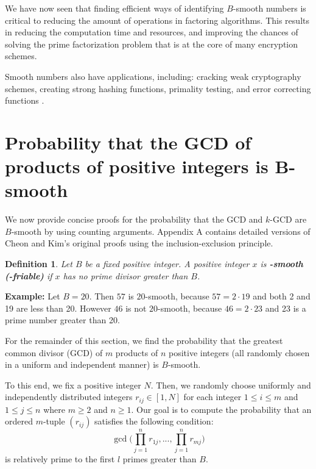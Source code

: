 \documentclass[12pt]{amsart}
\newtheorem{definition}[theorem]{Definition}
\theoremstyle{definition}
\begin{document}
We have now seen that finding efficient ways of identifying $B$-smooth numbers is critical to reducing the amount of operations in factoring algorithms. This results in reducing the computation time and resources, and improving the chances of solving the prime factorization problem that is at the core of many encryption schemes. 

Smooth numbers also have applications, including: cracking weak cryptography schemes, creating strong hashing functions, primality testing, and error correcting functions \cite{Naccache}.

\section{Probability that the GCD of products of positive integers is  B-smooth}
We now provide concise proofs for the probability that the GCD and $k$-GCD are $B$-smooth by using counting arguments. Appendix A contains detailed versions of Cheon and Kim's original proofs using the inclusion-exclusion principle. %

\begin{definition} Let $B$ be a fixed positive integer. A positive integer $x$ is \textbf{-smooth (-friable)} if $x$ has no prime divisor greater than $B$. 
\end{definition}

\noindent \textbf{Example:} Let $B = 20$. Then $57$ is $20$-smooth, because $57 = 2 \cdot 19$ and both 2 and 19 are less than 20. However $46$ is not $20$-smooth, because $46= 2 \cdot 23$ and 23 is a prime number greater than 20.

\vspace{.1 in}

For the remainder of this section, we find the probability that the greatest common divisor (GCD) of $m$ products of $n$ positive integers (all randomly chosen in a uniform and independent manner) is $B$-smooth.

\vspace{.1 in}

To this end, we fix a positive integer $N$. Then, we randomly choose uniformly and independently distributed  integers $r_{ij} \in [1, N]$ for each integer $1 \leq i \leq m$ and $1 \leq j \leq n$ where $m \geq 2$ and $n \geq 1$. Our goal is to compute the probability that an ordered $m$-tuple $(r_{ij})$ satisfies the following condition:
$$\gcd\Big(\prod_{j=1}^nr_{1j}, ..., \prod_{j=1}^n r_{mj}\Big)$$
is relatively prime to the first $l$ primes greater than $B$. 
\end{document}
